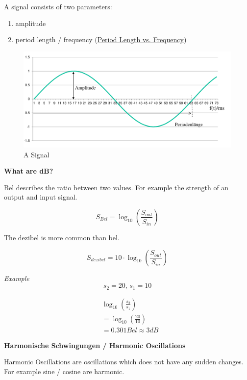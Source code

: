 \documentclass[11pt,twoside,twocolumn,landscape]{article}
\begin{document}
A signal consists of two parameters:
\begin{enumerate}
\item amplitude
\item period length / frequency (\href{../../../roam/20220101131242-period_length_vs_frequency.org}{Period Length vs. Frequency})
\end{enumerate}


\begin{figure}[htbp]
\centering
\includegraphics[width=.9\linewidth]{img/parameters_of_a_signal.png}
\caption{A Signal}
\end{figure}


\textbf{What are dB?}

Bel describes the ratio between two values.
For example the strength of an output and input signal.

\begin{equation}
S_{Bel} = \log_{10}(\frac{S_{out}}{S_{in}})
\end{equation}

The dezibel is more common than bel.

\begin{equation}
S_{dezibel} = 10 \cdot \log_{10}(\frac{S_{out}}{S_{in}})
\end{equation}

\emph{Example}
\begin{equation}
s_2 = 20,\, s_1 = 10
\end{equation}

\begin{align}
&  \log_{10}(\frac{s_2}{s_1}) \\
&= \log_{10}(\frac{20}{10}) \\
&= 0.301Bel \approx 3 dB
\end{align}

\textbf{Harmonische Schwingungen / Harmonic Oscillations}

Harmonic Oscillations are oscillations which does not have any sudden changes.
For example sine / cosine are harmonic.
\end{document}
